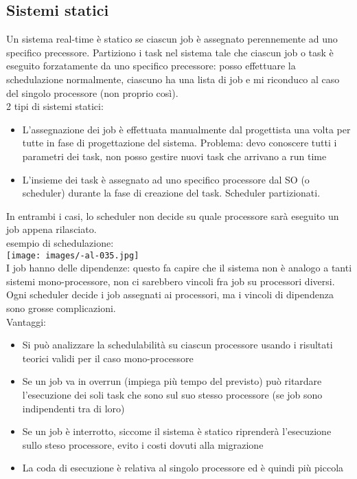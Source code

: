 \documentclass{article}
\begin{document}
\subsection{Sistemi statici}
Un sistema real-time è statico se ciascun job è assegnato perennemente ad uno specifico precessore. Partiziono i task nel sistema tale che ciascun job o task è eseguito forzatamente da uno specifico precessore: posso effettuare la schedulazione normalmente, ciascuno ha una lista di job e mi riconduco al caso del singolo processore (non proprio così).\\ 2 tipi di sistemi statici:
\begin{itemize}
\item L'assegnazione dei job è effettuata manualmente dal progettista una volta per tutte in fase di progettazione del sistema. Problema: devo conoscere tutti i parametri dei task, non posso gestire nuovi task che arrivano a run time
\item L'insieme dei task è assegnato ad uno specifico processore dal SO (o scheduler) durante la fase di creazione del task. Scheduler partizionati.
\end{itemize}
In entrambi i casi, lo scheduler non decide su quale processore sarà eseguito un job appena rilasciato.\\ esempio di schedulazione:\\
\texttt{[image: images/-al-035.jpg]}\\ I job hanno delle dipendenze: questo fa capire che il sistema non è analogo a tanti sistemi mono-processore, non ci sarebbero vincoli fra job su processori diversi. Ogni scheduler decide i job assegnati ai processori, ma i vincoli di dipendenza sono grosse complicazioni.\\ Vantaggi:
\begin{itemize}
\item Si può analizzare la schedulabilità su  ciascun processore usando i risultati teorici validi per il caso mono-processore
\item Se un job va in overrun (impiega più tempo del previsto) può ritardare l'esecuzione dei soli task che sono sul suo stesso processore (se job sono indipendenti tra di loro)
\item Se un job è interrotto, siccome il sistema è statico riprenderà l'esecuzione sullo steso processore, evito i costi dovuti alla migrazione
\item La coda di esecuzione è relativa al singolo processore ed è quindi più piccola
\end{itemize}
\end{document}
